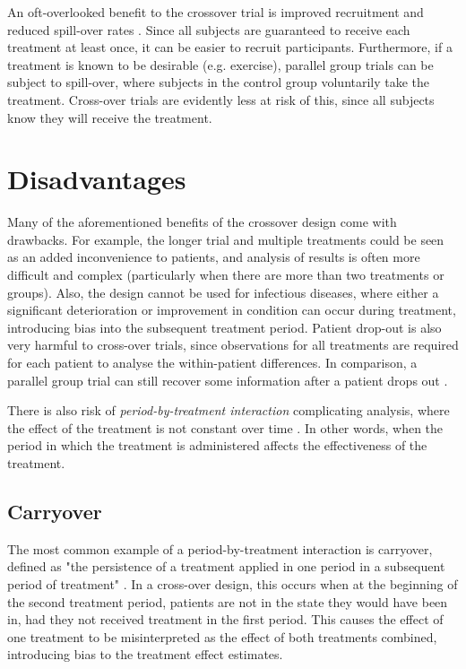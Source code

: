 \documentclass[12pt, TexShade, letterpaper]{report}
\begin{document}
An oft-overlooked benefit to the crossover trial is improved recruitment and reduced spill-over rates \cite{piantadosi2005clinical}. Since all subjects are guaranteed to receive each treatment at least once, it can be easier to recruit participants. Furthermore, if a treatment is known to be desirable (e.g. exercise), parallel group trials can be subject to spill-over, where subjects in the control group voluntarily take the treatment. Cross-over trials are evidently less at risk of this, since all subjects know they will receive the treatment.

\section{Disadvantages}
Many of the aforementioned benefits of the crossover design come with drawbacks. For example, the longer trial and multiple treatments could be seen as an added inconvenience to patients, and analysis of results is often more difficult and complex (particularly when there are more than two treatments or groups). Also, the design cannot be used for infectious diseases, where either a significant deterioration or improvement in condition can occur during treatment, introducing bias into the subsequent treatment period. Patient drop-out is also very harmful to cross-over trials, since observations for all treatments are required for each patient to analyse the within-patient differences. In comparison, a parallel group trial can still recover some information after a patient drops out \cite{senn2002crossover}.

There is also risk of \textit{period-by-treatment interaction} complicating analysis, where the effect of the treatment is not constant over time \cite{senn2002crossover}. In other words, when the period in which the treatment is administered affects the effectiveness of the treatment.

\subsection{Carryover}
The most common example of a period-by-treatment interaction is carryover, defined as "the persistence of a treatment applied in one period in a subsequent period of treatment" \cite{senn2002crossover}. In a cross-over design, this occurs when at the beginning of the second treatment period, patients are not in the state they would have been in, had they not received treatment in the first period. This causes the effect of one treatment to be misinterpreted as the effect of both treatments combined, introducing bias to the treatment effect estimates.
\end{document}
